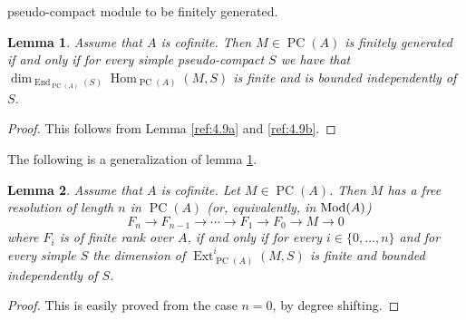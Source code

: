 \documentclass{amsproc}
\def\Mod{\mathop{\text{Mod}}}
\def\Ext{\operatorname {Ext}}
\def\Hom{\operatorname {Hom}}
\def\End{\operatorname {End}}
\def\r{\rightarrow}
\let\oldtext\text
\def\text#1{\oldtext{\upshape #1}}
\DeclareMathOperator{\PC}{PC}
\newtheorem{lemma}{Lemma}[section]
\theoremstyle{definition}
\theoremstyle{remark}
\numberwithin{equation}{section}
\numberwithin{table}{section}
\numberwithin{figure}{section}
\begin{document}
pseudo-compact module to be finitely generated.
\begin{lemma}
\label{ref:4.17a}
Assume that $A$ is cofinite. Then $M\in \PC(A)$ is finitely generated
if and only if for every simple pseudo-compact $S$ we have that
$\dim_{\End_{\PC(A)}(S)}\Hom_{\PC(A)}(M,S)$ is finite and is
bounded independently of $S$.
\end{lemma}
\begin{proof}
This follows from Lemma \ref{ref:4.9a} and \eqref{ref:4.9b}.
\end{proof}
The following is a generalization of lemma \ref{ref:4.17a}.
\begin{lemma}
\label{ref:4.18a}
Assume that $A$ is cofinite. Let $M\in\PC(A)$. Then $M$ has a
 free resolution of length $n$ in $\PC(A)$ (or, equivalently, in
$\Mod(A)$) \[
F_n\r F_{n-1}\r \cdots \r F_1\r F_0\r M\r 0
\]
where $F_i$ is  of finite rank over $A$, if and only if
for every
$i\in\{0,\ldots,n\}
$ and for every simple $S$ the dimension of $\Ext^i_{\PC(A)}(M,S)
$ is finite and bounded independently of $S$.
\end{lemma} \begin{proof}
This is easily proved from the case $n=0$, by degree shifting.
\end{proof}
\end{document}
